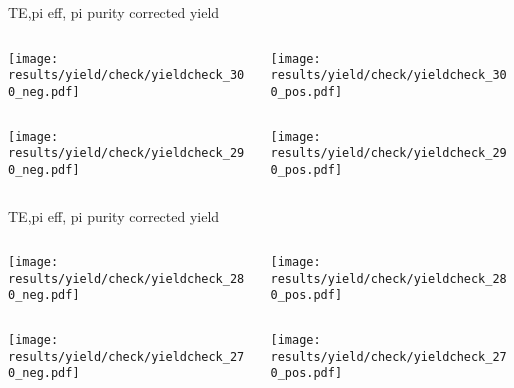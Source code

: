 \begin{frame}{TE,pi eff, pi purity corrected yield}
\begin{columns}
\begin{column}[T]{0.5\textwidth}
\texttt{[image: results/yield/check/yieldcheck\_300\_neg.pdf]}
\end{column}
\begin{column}[T]{0.5\textwidth}
\texttt{[image: results/yield/check/yieldcheck\_300\_pos.pdf]}
\end{column}
\end{columns}
\begin{columns}
\begin{column}[T]{0.5\textwidth}
\texttt{[image: results/yield/check/yieldcheck\_290\_neg.pdf]}
\end{column}
\begin{column}[T]{0.5\textwidth}
\texttt{[image: results/yield/check/yieldcheck\_290\_pos.pdf]}
\end{column}
\end{columns}
\end{frame}
\begin{frame}{TE,pi eff, pi purity corrected yield}
\begin{columns}
\begin{column}[T]{0.5\textwidth}
\texttt{[image: results/yield/check/yieldcheck\_280\_neg.pdf]}
\end{column}
\begin{column}[T]{0.5\textwidth}
\texttt{[image: results/yield/check/yieldcheck\_280\_pos.pdf]}
\end{column}
\end{columns}
\begin{columns}
\begin{column}[T]{0.5\textwidth}
\texttt{[image: results/yield/check/yieldcheck\_270\_neg.pdf]}
\end{column}
\begin{column}[T]{0.5\textwidth}
\texttt{[image: results/yield/check/yieldcheck\_270\_pos.pdf]}
\end{column}
\end{columns}
\end{frame}
